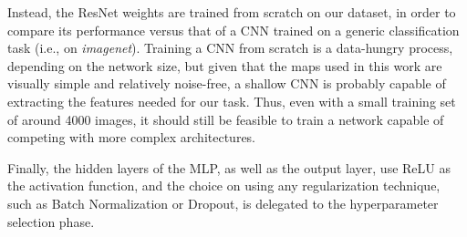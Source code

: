 Instead, the ResNet weights are trained from scratch on our dataset, in order to compare its performance versus that of a CNN trained on a generic classification task (i.e., on \textit{imagenet}). Training a CNN from scratch is a data-hungry process, depending on the network size, but given that the maps used in this work are visually simple and relatively noise-free, a shallow CNN is probably capable of extracting the features needed for our task. Thus, even with a small training set of around 4000 images, it should still be feasible to train a network capable of competing with more complex architectures.


\noindent
Finally, the hidden layers of the MLP, as well as the output layer, use ReLU as the activation function, and the choice on using any regularization technique, such as Batch Normalization or Dropout, is delegated to the hyperparameter selection phase.
